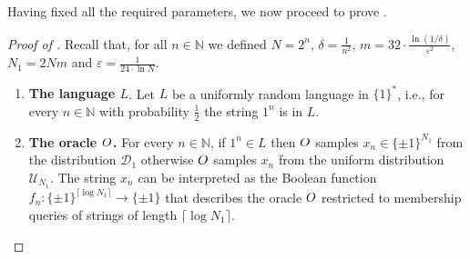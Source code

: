 \documentclass{article}
\begin{document}
Having fixed all the required parameters, we now proceed to prove . 



\begin{proof}[Proof of ]
Recall that, for all $n \in \mathbb{N}$ we defined $N=2^n$, $\delta = \frac{1}{n^2}$, $m=32 \cdot \frac{\ln(1/{\delta})}{\varepsilon^2}$, $N_1=2Nm$ and $\varepsilon = \frac{1}{24 \cdot \ln{N}}$. 
\begin{enumerate}
    \item \label{Item:TheLanguage} \textbf{The language $L$}. Let $L$ be a uniformly random language in $\{1\}^*$, i.e., for every $n \in \mathbb{N}$ with probability $\frac{1}{2}$ the string $1^n$ is in $L$.
    
    \item \label{Item:DistOracle} \textbf{The oracle $O$.} For every $n \in \mathbb{N}$, if $1^n \in L$ then $O$ samples $x_n \in \{\pm 1\}^{N_1}$ from the distribution $\mathcal{D}_1$ otherwise $O$ samples $x_n$ from the uniform distribution $\mathcal{U}_{N_1}$. The string $x_n$ can be interpreted as the Boolean function $f_n:\{\pm 1\}^{\lceil \log{N_1} \rceil} \rightarrow \{\pm 1\}$ that describes the oracle $O$ restricted to membership queries of strings of length $\lceil \log{N_1} \rceil$.
    

\end{enumerate}
\end{proof}
\end{document}

